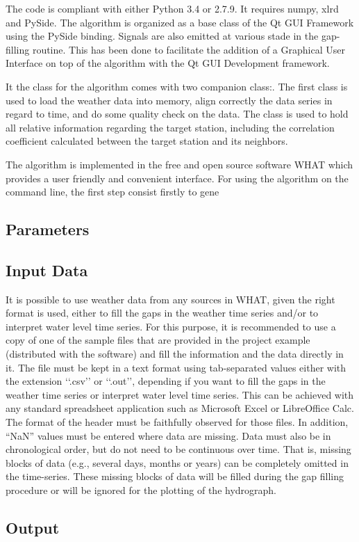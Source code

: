 \documentclass[TechnicalNoteMeteo.tex]{subfiles}
\begin{document}
The code is compliant with either Python 3.4 or 2.7.9. It requires numpy, xlrd and PySide. The algorithm is organized as a base class of the Qt GUI Framework using the PySide binding. Signals are also emitted at various stade in the gap-filling routine. This has been done to facilitate the addition of a Graphical User Interface on top of the algorithm with the Qt GUI Development framework.

It the class for the algorithm comes with two companion class:. The first class is used to load the weather data into memory, align correctly the data series in regard to time, and do some quality check on the data. The class is used to hold all relative information regarding the target station, including the correlation coefficient calculated between the target station and its neighbors.

The algorithm is implemented in the free and open source software WHAT which provides a user friendly and convenient interface. For using the algorithm on the command line, the first step consist firstly to gene

\subsection{Parameters}\label{sec:parameters}


\subsection{Input Data}

It is possible to use weather data from any sources in WHAT, given the right format is used, either to fill the gaps in the weather time series and/or to interpret water level time series. For this purpose, it is recommended to use a copy of one of the sample files that are provided in the project example (distributed with the software) and fill the information and the data directly in it. The file must be kept in a text format using tab-separated values either with the extension ‘‘.csv’’ or ‘‘.out’’, depending if you want to fill the gaps in the weather time series or  interpret water level time series. This can be achieved with any standard spreadsheet application such as Microsoft Excel or LibreOffice Calc. The format of the header must be faithfully observed for those files. In addition, ``NaN'' values must be entered where data are missing. Data must also be in chronological order, but do not need to be continuous over time. That is, missing blocks of data (e.g., several days, months or years) can be completely omitted in the time-series. These missing blocks of data will be filled during the gap filling procedure or will be ignored for the plotting of the hydrograph.

\subsection{Output}\label{sec:output}
\end{document}
